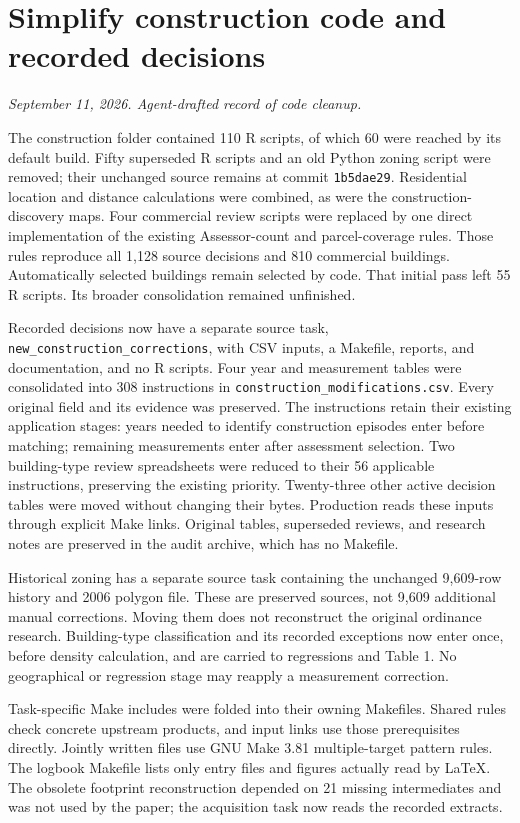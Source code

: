 \section*{Simplify construction code and recorded decisions}
\textit{September 11, 2026. Agent-drafted record of code cleanup.}

The construction folder contained 110 R scripts, of which 60 were reached by
its default build. Fifty superseded R scripts and an old Python zoning script
were removed; their unchanged source remains at commit \texttt{1b5dae29}.
Residential location and distance calculations were combined, as were the
construction-discovery maps. Four commercial review scripts were replaced by
one direct implementation of the existing Assessor-count and parcel-coverage
rules. Those rules reproduce all 1,128 source decisions and 810 commercial
buildings. Automatically selected buildings remain selected by code.
That initial pass left 55 R scripts. Its broader consolidation remained
unfinished.

Recorded decisions now have a separate source task,
\texttt{new\_construction\_corrections}, with CSV inputs, a Makefile, reports,
and documentation, and no R scripts. Four year and measurement tables were
consolidated into 308 instructions in \texttt{construction\_modifications.csv}.
Every original field and its evidence was preserved. The instructions retain
their existing application stages: years needed to identify construction
episodes enter before matching; remaining measurements enter after assessment
selection. Two building-type review spreadsheets were reduced to their 56
applicable instructions, preserving the existing priority. Twenty-three other
active decision tables were moved without changing their bytes. Production
reads these inputs through explicit Make links. Original tables, superseded
reviews, and research notes are preserved in the audit archive, which has no
Makefile.

Historical zoning has a separate source task containing the unchanged
9,609-row history and 2006 polygon file. These are preserved sources, not
9,609 additional manual corrections. Moving them does not reconstruct the
original ordinance research. Building-type classification and its recorded
exceptions now enter once, before density calculation, and are carried to
regressions and Table 1. No geographical or regression stage may reapply a
measurement correction.

Task-specific Make includes were folded into their owning Makefiles. Shared
rules check concrete upstream products, and input links use those prerequisites
directly. Jointly written files use GNU Make 3.81 multiple-target pattern rules.
The logbook Makefile lists only entry files and figures actually read by LaTeX.
The obsolete footprint reconstruction depended on 21 missing intermediates and
was not used by the paper; the acquisition task now reads the recorded extracts.

